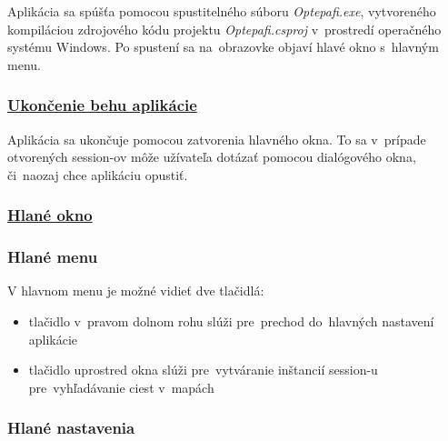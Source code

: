 \documentclass[12pt,a4paper]{report}
\begin{document}
Aplikácia sa spúšťa pomocou spustitelného súboru \textit{Optepafi.exe}, vytvoreného kompiláciou zdrojového kódu projektu \textit{Optepafi.csproj} v~prostredí operačného systému Windows. Po spustení sa na~obrazovke objaví hlavé okno s~hlavným menu.

\subsubsection{\underline{Ukončenie behu aplikácie}}

Aplikácia sa ukončuje pomocou zatvorenia hlavného okna. To sa v~prípade otvorených session-ov môže užívateľa dotázať pomocou dialógového okna, či~naozaj chce aplikáciu opustiť.

\pagebreak

\subsubsection{\underline{Hlané okno}}

\subsubsection{Hlané menu}

\begin{figure}[h]\centering
{}
\end{figure}

V hlavnom menu je možné vidieť dve tlačidlá:
\begin{itemize}
    \item tlačidlo v~pravom dolnom rohu slúži pre~prechod do~hlavných nastavení aplikácie
    \item tlačidlo uprostred okna slúži pre~vytváranie inštancií session-u pre~vyhľadávanie ciest v~mapách
\end{itemize}

\subsubsection{Hlané nastavenia}
\end{document}
